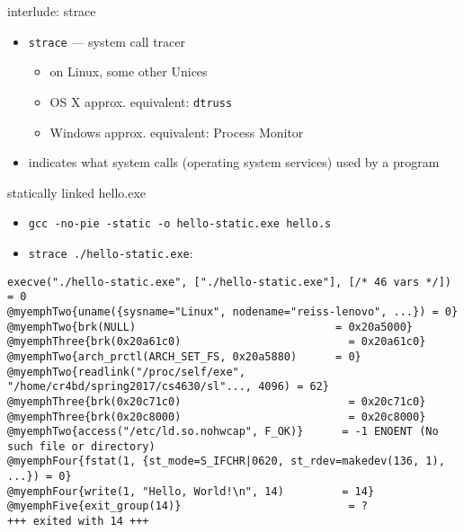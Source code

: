 \begin{frame}{interlude: strace}
\begin{itemize}
\item {\tt strace} --- system call tracer
    \begin{itemize}
    \item on Linux, some other Unices
    \item OS X approx. equivalent: {\tt dtruss}
    \item Windows approx. equivalent: Process Monitor
    \end{itemize}
\item indicates what system calls (operating system services) used by a program
\end{itemize}
\end{frame}

\begin{frame}[fragile,label=staticStrace]{statically linked hello.exe}
\begin{itemize}
\item \small{\tt gcc -no-pie -static -o hello-static.exe hello.s}
\item \small{\tt strace ./hello-static.exe}:
\end{itemize}
\begin{Verbatim}[commandchars=@\{\},fontsize=\fontsize{8}{9}\selectfont]
execve("./hello-static.exe", ["./hello-static.exe"], [/* 46 vars */]) = 0
@myemphTwo{uname({sysname="Linux", nodename="reiss-lenovo", ...}) = 0}
@myemphTwo{brk(NULL)                               = 0x20a5000}
@myemphThree{brk(0x20a61c0)                          = 0x20a61c0}
@myemphTwo{arch_prctl(ARCH_SET_FS, 0x20a5880)      = 0}
@myemphTwo{readlink("/proc/self/exe", "/home/cr4bd/spring2017/cs4630/sl"..., 4096) = 62}
@myemphThree{brk(0x20c71c0)                          = 0x20c71c0}
@myemphThree{brk(0x20c8000)                          = 0x20c8000}
@myemphTwo{access("/etc/ld.so.nohwcap", F_OK)}      = -1 ENOENT (No such file or directory)
@myemphFour{fstat(1, {st_mode=S_IFCHR|0620, st_rdev=makedev(136, 1), ...}) = 0}
@myemphFour{write(1, "Hello, World!\n", 14)         = 14}
@myemphFive{exit_group(14)}                          = ?
+++ exited with 14 +++
\end{Verbatim}
\end{frame}
